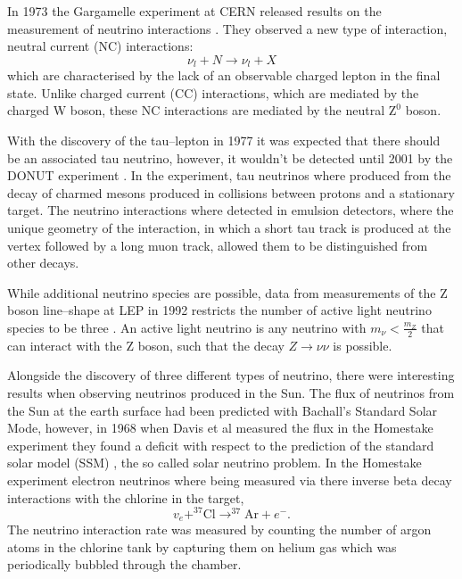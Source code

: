 In 1973 the Gargamelle experiment at CERN released results on the measurement of
neutrino interactions \cite{Hasert1973}. They observed a new type of 
interaction, neutral current (NC) interactions: 
\begin{equation}
	\nu_l + N \rightarrow \nu_l + X
\end{equation}
which are characterised by the lack of an observable charged lepton in the final
state. Unlike charged current (CC) interactions, which are mediated by the 
charged W boson, these NC interactions are mediated by the neutral 
\(\mbox{Z}^0\) boson.

With the discovery of the tau--lepton in 1977 it was expected that there should 
be an associated tau neutrino, however, it wouldn't be detected until 2001 by 
the DONUT experiment \cite{Kodama2001}. In the experiment, tau neutrinos where 
produced from the decay of charmed mesons produced in collisions between protons 
and a stationary target. The neutrino interactions where detected in emulsion 
detectors, where the unique geometry of the interaction, in which a short tau 
track is produced at the vertex followed by a long muon track, allowed them to 
be distinguished from other decays.

While additional neutrino species are possible, data from measurements of the Z 
boson line--shape at LEP in 1992 restricts the number of active light neutrino 
species to be three \cite{LEP1992}. An active light neutrino is any neutrino 
with \(m_\nu < \frac{m_Z}{2}\) that can interact with the Z boson, such that the 
decay \(Z \rightarrow \nu \nu \) is possible.

Alongside the discovery of three different types of neutrino, there were
interesting results when observing neutrinos produced in the Sun. The flux of
neutrinos from the Sun at the earth surface had been predicted with Bachall's 
Standard Solar Mode, however, in 1968 when Davis et al measured the flux in the
Homestake experiment they found a deficit with respect to the prediction of the
standard solar model (SSM) \cite{Davis1968, Bahcall1968}, the so called solar neutrino 
problem. In the Homestake experiment electron neutrinos where being measured via 
there inverse beta decay interactions with the chlorine in the target,
\begin{equation}
	v_e + ^{37}\mbox{Cl} \rightarrow ^{37}\mbox{Ar} + e^-.
\end{equation}
The neutrino interaction rate was measured by counting the number of argon 
atoms in the chlorine tank by capturing them on helium gas which was
periodically bubbled through the chamber.

